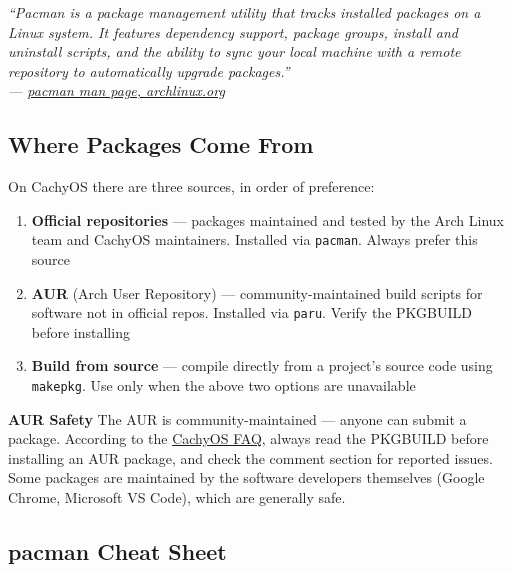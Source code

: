 \documentclass{article}
\newcommand{\code}[1]{\colorbox{codebg}{\texttt{#1}}}
\begin{document}
\begin{mdframed}[linewidth=1.5pt, linecolor=black!50, topline=true, bottomline=true,
	leftline=false, rightline=false, backgroundcolor=black!3]
	\small\itshape
	``Pacman is a package management utility that tracks installed packages on a
	Linux system. It features dependency support, package groups, install and
	uninstall scripts, and the ability to sync your local machine with a remote
	repository to automatically upgrade packages.''\\[4pt]
	\normalfont\small ---
	\href{https://archlinux.org/pacman/pacman.8.html}{pacman man page, archlinux.org}
\end{mdframed}

\subsection{Where Packages Come From}

On CachyOS there are three sources, in order of preference:

\begin{enumerate}[leftmargin=1.5em, label={\arabic*.}]
	\item \textbf{Official repositories} --- packages maintained and tested by the
	Arch Linux team and CachyOS maintainers. Installed via \code{pacman}. Always
	prefer this source
	\item \textbf{AUR} (Arch User Repository) --- community-maintained build scripts
	for software not in official repos. Installed via \code{paru}. Verify the
	PKGBUILD before installing
	\item \textbf{Build from source} --- compile directly from a project's source code
	using \code{makepkg}. Use only when the above two options are unavailable
\end{enumerate}

\begin{callout}{\textbf{AUR Safety}}
	The AUR is community-maintained --- anyone can submit a package. According to the
	\href{https://wiki.cachyos.org/cachyos_basic/faq/}{CachyOS FAQ}, always read the
	PKGBUILD before installing an AUR package, and check the comment section for
	reported issues. Some packages are maintained by the software developers themselves
	(Google Chrome, Microsoft VS Code), which are generally safe.
\end{callout}

\subsection{pacman Cheat Sheet}
\end{document}
